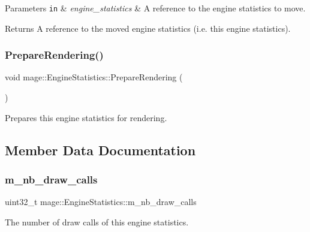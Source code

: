 \begin{DoxyParams}[1]{Parameters}
\mbox{\tt in}  & {\em engine\+\_\+statistics} & A reference to the engine statistics to move. \\
\hline
\end{DoxyParams}
\begin{DoxyReturn}{Returns}
A reference to the moved engine statistics (i.\+e. this engine statistics). 
\end{DoxyReturn}
\hypertarget{structmage_1_1_engine_statistics_a722912aa5e93caff589a52bb10be930d}{}\label{structmage_1_1_engine_statistics_a722912aa5e93caff589a52bb10be930d} 
\subsubsection{\texorpdfstring{Prepare\+Rendering()}{PrepareRendering()}}
{\footnotesize\ttfamily void mage\+::\+Engine\+Statistics\+::\+Prepare\+Rendering (\begin{DoxyParamCaption}{ }\end{DoxyParamCaption})\hspace{0.3cm}{\ttfamily [noexcept]}}

Prepares this engine statistics for rendering. 

\subsection{Member Data Documentation}
\hypertarget{structmage_1_1_engine_statistics_a6667673ee9eb691c09d4c14eccef7657}{}\label{structmage_1_1_engine_statistics_a6667673ee9eb691c09d4c14eccef7657} 
\subsubsection{\texorpdfstring{m\+\_\+nb\+\_\+draw\+\_\+calls}{m\_nb\_draw\_calls}}
{\footnotesize\ttfamily uint32\+\_\+t mage\+::\+Engine\+Statistics\+::m\+\_\+nb\+\_\+draw\+\_\+calls\hspace{0.3cm}{\ttfamily [private]}}

The number of draw calls of this engine statistics. 